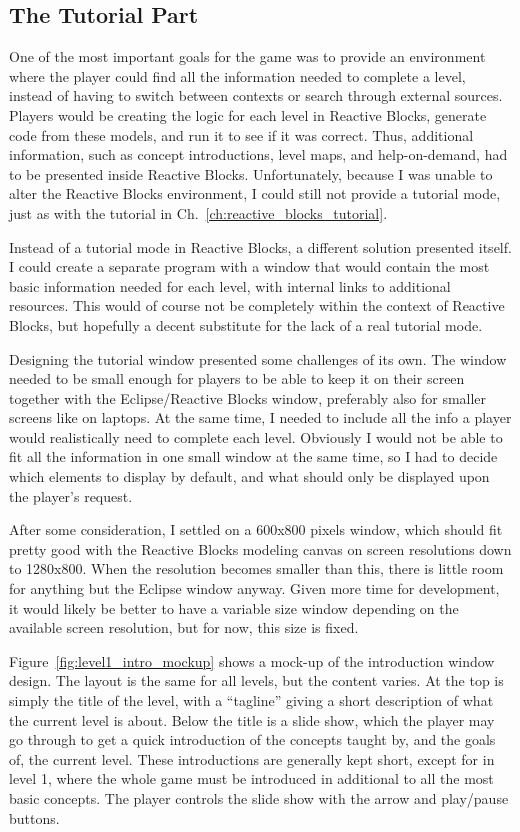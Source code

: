 \subsection{The Tutorial Part}
\label{sec:game_tutorial}
One of the most important goals for the game was to provide an environment where the player could find all the information needed to complete a level, instead of having to switch between contexts or search through external sources. Players would be creating the logic for each level in Reactive Blocks, generate code from these models, and run it to see if it was correct. Thus, additional information, such as concept introductions, level maps, and help-on-demand, had to be presented inside Reactive Blocks. Unfortunately, because I was unable to alter the Reactive Blocks environment, I could still not provide a tutorial mode, just as with the tutorial in Ch.~\ref{ch:reactive_blocks_tutorial}.

\noindent
Instead of a tutorial mode in Reactive Blocks, a different solution presented itself. I could create a separate program with a window that would contain the most basic information needed for each level, with internal links to additional resources. This would of course not be completely within the context of Reactive Blocks, but hopefully a decent substitute for the lack of a real tutorial mode.

\noindent
Designing the tutorial window presented some challenges of its own. The window needed to be small enough for players to be able to keep it on their screen together with the Eclipse/Reactive Blocks window, preferably also for smaller screens like on laptops. At the same time, I needed to include all the info a player would realistically need to complete each level. Obviously I would not be able to fit all the information in one small window at the same time, so I had to decide which elements to display by default, and what should only be displayed upon the player's request.

\noindent
After some consideration, I settled on a 600x800 pixels window, which should fit pretty good with the Reactive Blocks modeling canvas on screen resolutions down to 1280x800. When the resolution becomes smaller than this, there is little room for anything but the Eclipse window anyway. Given more time for development, it would likely be better to have a variable size window depending on the available screen resolution, but for now, this size is fixed.

\noindent
Figure~\ref{fig:level1_intro_mockup} shows a mock-up of the introduction window design. The layout is the same for all levels, but the content varies. At the top is simply the title of the level, with a ``tagline'' giving a short description of what the current level is about. Below the title is a slide show, which the player may go through to get a quick introduction of the concepts taught by, and the goals of, the current level. These introductions are generally kept short, except for in level 1, where the whole game must be introduced in additional to all the most basic concepts. The player controls the slide show with the arrow and play/pause buttons.

